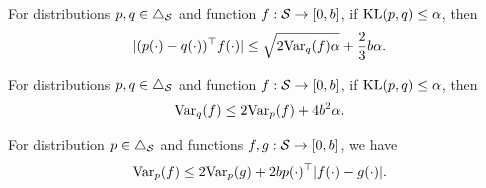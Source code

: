 \begin{lemma} \label{lemma:bernstern_kl}
	For distributions $p,q \in \triangle_{\mathcal{S}}$ and function $f:\mathcal{S} \rightarrow [0,b]$, if $\textup{KL}(p,q)\leq \alpha$, then
	\begin{align*}
		|(p(\cdot)-q(\cdot))^\top f(\cdot)| \leq \sqrt{2\textup{Var}_q(f)\alpha}+\frac{2}{3}b\alpha .
	\end{align*}
\end{lemma}

\begin{lemma} \label{lemma:var_change_p}
	For distributions $p,q \in \triangle_{\mathcal{S}}$ and function $f:\mathcal{S} \rightarrow [0,b]$, if $\textup{KL}(p,q)\leq \alpha$, then
	\begin{align*}
		\textup{Var}_q(f) \leq 2\textup{Var}_p(f) + 4 b^2 \alpha .
	\end{align*}
\end{lemma}

\begin{lemma} \label{lemma:var_change_f}
	For distribution $p \in \triangle_{\mathcal{S}}$ and functions $f,g:\mathcal{S} \rightarrow [0,b]$, we have
	\begin{align*}
		\textup{Var}_p(f) \leq 2 \textup{Var}_p(g) + 2b p(\cdot)^\top |f(\cdot)-g(\cdot)| .
	\end{align*}
\end{lemma}

